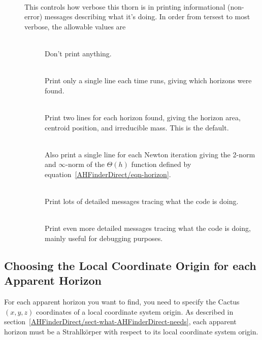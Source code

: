 \begin{description}
\item[]
\mbox{}\\
	This controls how verbose this thorn is in printing
	informational (non-error) messages describing what it's
	doing.  In order from tersest to most verbose, the allowable
	values are
	\begin{description}
	\item[]
	\mbox{}\\
		Don't print anything.
	\item[]
	\mbox{}\\
		Print only a single line each time
		 runs, giving which
		horizons were found.
	\item[]
	\mbox{}\\
		Print two lines for each horizon found, giving
		the horizon area, centroid position, and irreducible mass.
		This is the default.
	\item[]
	\mbox{}\\
		Also print a single line for each Newton iteration giving
		the 2-norm and $\infty$-norm of the $\Theta(h)$ function
		defined by equation~\eqref{AHFinderDirect/eqn-horizon}.
	\item[]
	\mbox{}\\
		Print lots of detailed messages tracing what the code
		is doing.
	\item[]
	\mbox{}\\
		Print even more detailed messages tracing what the code
		is doing, mainly useful for debugging purposes.
	\end{description}
\end{description}


\subsection{Choosing the Local Coordinate Origin for each Apparent Horizon}
\label{AHFinderDirect/sect-parameters/local-coordinate-origin}

For each apparent horizon you want to find, you need to specify
the Cactus $(x,y,z)$ coordinates of a local coordinate system origin.
As described in
section~\ref{AHFinderDirect/sect-what-AHFinderDirect-needs},
each apparent horizon must be a Strahlk\"{o}rper with respect to its
local coordinate system origin.

